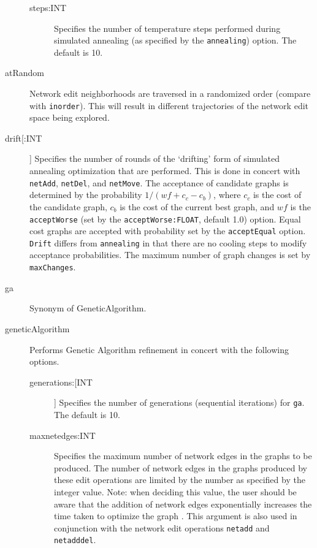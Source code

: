 \begin{description}
\begin{description}
			\item[steps:INT] Specifies the number of temperature steps performed 
			during simulated annealing (as specified by the \texttt{annealing}) option.
			The default is 10.
			
		\end{description}
			
		\item[atRandom] Network edit neighborhoods are traversed in a randomized order (compare 
		with \texttt{inorder}). 	This will result in different trajectories of the network edit space being 
		explored.

		\item[drift[:INT]] Specifies the number of rounds of the `drifting' form of simulated 
		annealing optimization \citep{goloboff1999} that are performed. This is done in concert 
		with \texttt{netAdd}, \texttt{netDel}, and \texttt{netMove}. The acceptance of candidate 
		graphs is determined by the probability $1/ (wf + c_c - c_b)$, where $c_c$ is the cost 
		of the candidate graph, $c_b$ is the cost of the current best graph, and $wf$ is the 
		\texttt{acceptWorse} (set by the \texttt{acceptWorse:FLOAT}, default 1.0) option. Equal 
		cost graphs are accepted with probability set by the \texttt{acceptEqual} option. 
		\texttt{Drift} differs from \texttt{annealing} in that there are no cooling steps to modify 
		acceptance probabilities. The maximum number of graph changes is set by 
		\texttt{maxChanges}.
				
		\item[ga] Synonym of GeneticAlgorithm.
		
		\item[geneticAlgorithm] Performs Genetic Algorithm \citep{Holland1975} refinement in 
		concert with the following options.
					
		\begin{description}
			
			
			\item[generations:[INT]] Specifies the number of generations (sequential iterations) for 
			\texttt{ga}. The default is 10.
			
			\item[maxnetedges:INT] Specifies the maximum number of network edges in the graphs 
			to be produced. The number of network edges in the graphs produced 
			by these edit operations are limited by the number as specified by the integer value.
			Note: when deciding this value, the user should be aware that the addition of network 
			edges exponentially increases the time taken to optimize the graph 
			\cite{WheelerandWashburn2023}. This argument is also used in conjunction with the 
			network edit operations \texttt{netadd} and \texttt{netadddel}. 


\end{description}
\end{description}
